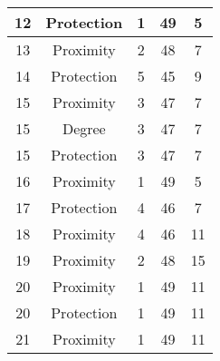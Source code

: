 \documentclass[results.tex]{subfiles}
\begin{document}
\begin{center}
\begin{tabular}{| c || c | c | c | c |}
            \hline
            12                      & Protection                   & 1                      & 49                      & 5                    \\
            \hline
            13                      & Proximity                    & 2                      & 48                      & 7                    \\
            \hline
            14                      & Protection                   & 5                      & 45                      & 9                    \\
            \hline
            15                      & Proximity                    & 3                      & 47                      & 7                    \\
            \hline
            15                      & Degree                       & 3                      & 47                      & 7                    \\
            \hline
            15                      & Protection                   & 3                      & 47                      & 7                    \\
            \hline
            16                      & Proximity                    & 1                      & 49                      & 5                    \\
            \hline
            17                      & Protection                   & 4                      & 46                      & 7                    \\
            \hline
            18                      & Proximity                    & 4                      & 46                      & 11                   \\
            \hline
            19                      & Proximity                    & 2                      & 48                      & 15                   \\
            \hline
            20                      & Proximity                    & 1                      & 49                      & 11                   \\
            \hline
            20                      & Protection                   & 1                      & 49                      & 11                   \\
            \hline
            21                      & Proximity                    & 1                      & 49                      & 11                   \\

\end{tabular}
\end{center}
\end{document}
